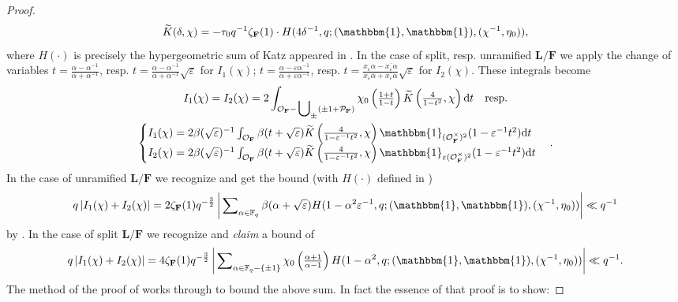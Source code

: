 \documentclass[A4]{amsart}
\numberwithin{equation}{section} \everymath{\displaystyle}
\newcommand{\id}{\mathbbm{1}}
\newcommand{\ud}{\mathrm{d}}
\newcommand{\F}{\mathbf{F}}
\newcommand{\fF}{\mathbb{F}}
\newcommand{\bL}{\mathbf{L}}
\newcommand{\vO}{\mathcal{O}}
\newcommand{\vP}{\mathcal{P}}
\newcommand{\extnorm}[1]{\left\lvert #1 \right\rvert}
\begin{document}
\begin{proof}
	$$ \widetilde{K}(\delta, \chi) = - \tau_0 q^{-1} \zeta_{\F}(1) \cdot H(4\delta^{-1},q; (\id, \id), (\chi^{-1},\eta_0)), $$
where $H(\cdot)$ is precisely the hypergeometric sum of Katz appeared in \cite[\S 5.4]{WX23+}. In the case of split, resp. unramified $\bL/\F$ we apply the change of variables $t = \tfrac{\alpha - \alpha^{-1}}{\alpha + \alpha^{-1}}$, resp. $t = \tfrac{\alpha - \alpha^{-1}}{\alpha + \alpha^{-1}} \sqrt{\varepsilon}$ for $I_1(\chi)$; $t = \tfrac{\alpha - \varepsilon \alpha^{-1}}{\alpha + \varepsilon \alpha^{-1}}$, resp. $t = \tfrac{x_{\varepsilon}\alpha - \overline{x_{\varepsilon}\alpha}}{x_{\varepsilon}\alpha + \overline{x_{\varepsilon}\alpha}} \sqrt{\varepsilon}$ for $I_2(\chi)$. These integrals become
\begin{multline*} 
	I_1(\chi) = I_2(\chi) = 2 \int_{\vO_{\F} - \sideset{}{_{\pm}} \bigcup (\pm 1+\vP_{\F})} \chi_0 \left( \tfrac{1+t}{1-t} \right) \widetilde{K} \left( \tfrac{4}{1-t^2}, \chi \right) \ud t \quad {\rm resp.} \\
	\begin{cases} 
		I_1(\chi) = 2\beta(\sqrt{\varepsilon})^{-1} \int_{\vO_{\F}} \beta(t + \sqrt{\varepsilon}) \widetilde{K} \left( \tfrac{4}{1-\varepsilon^{-1}t^2}, \chi \right) \id_{(\vO_{\F}^{\times})^2}(1-\varepsilon^{-1}t^2) \ud t \\
		I_2(\chi) = 2\beta(\sqrt{\varepsilon})^{-1} \int_{\vO_{\F}} \beta(t + \sqrt{\varepsilon}) \widetilde{K} \left( \tfrac{4}{1-\varepsilon^{-1}t^2}, \chi \right) \id_{\varepsilon (\vO_{\F}^{\times})^2}(1-\varepsilon^{-1}t^2) \ud t
	\end{cases}.
\end{multline*}
	In the case of unramified $\bL/\F$ we recognize and get the bound (with $H(\cdot)$ defined in \cite[\S 5.3.2]{WX23+})
	$$ q \extnorm{I_1(\chi) + I_2(\chi)} = 2 \zeta_{\F}(1) q^{-\frac{3}{2}} \extnorm{ \sideset{}{_{\alpha \in \fF_q}} \sum \beta(\alpha + \sqrt{\varepsilon}) H(1-\alpha^2 \varepsilon^{-1},q; (\id, \id), (\chi^{-1},\eta_0))} \ll q^{-1} $$
	by \cite[Lemma 5.10]{WX23+}. In the case of split $\bL/\F$ we recognize and \emph{claim} a bound of
\begin{equation} \label{eq: PYExpSVar}
	q \extnorm{I_1(\chi) + I_2(\chi)} = 4 \zeta_{\F}(1) q^{-\frac{3}{2}} \extnorm{ \sideset{}{_{\alpha \in \fF_q - \{ \pm 1\}}} \sum \chi_0 \left( \tfrac{\alpha +1}{\alpha-1} \right) H(1-\alpha^2,q; (\id, \id), (\chi^{-1},\eta_0))} \ll q^{-1}. 
\end{equation}
	The method of the proof of \cite[Lemma 5.10]{WX23+} works through to bound the above sum. In fact the essence of that proof is to show:

\end{proof}
\end{document}
